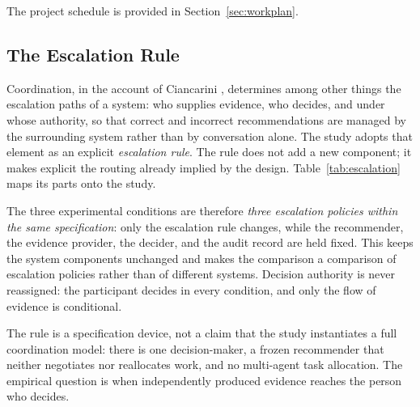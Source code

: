 \documentclass[oneside,final,14pt,a4paper]{extreport}
\begin{document}
The project schedule is provided in Section~\ref{sec:workplan}.

\subsection{The Escalation Rule}
\label{subsec:design}

Coordination, in the account of Ciancarini \cite{Ciancarini2027}, determines
among other things the escalation paths of a system: who supplies evidence, who
decides, and under whose authority, so that correct and incorrect
recommendations are managed by the surrounding system rather than by
conversation alone. The study adopts that element as an explicit
\emph{escalation rule}. The rule does not add a new component; it makes
explicit the routing already implied by the design. Table~\ref{tab:escalation}
maps its parts onto the study.

The three experimental conditions are therefore \emph{three escalation policies
within the same specification}: only the escalation rule changes, while the
recommender, the evidence provider, the decider, and the audit record are held
fixed. This keeps the system components unchanged and makes the comparison a
comparison of escalation policies rather than of different systems. Decision
authority is never reassigned: the participant decides in every condition, and
only the flow of evidence is conditional.

The rule is a specification device, not a claim that the study instantiates a
full coordination model: there is one decision-maker, a frozen recommender that
neither negotiates nor reallocates work, and no multi-agent task allocation.
The empirical question is when independently produced evidence reaches the
person who decides.
\end{document}

